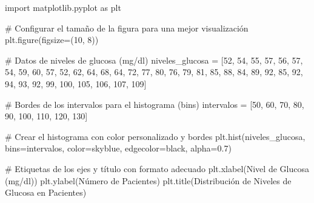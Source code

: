 \documentclass[
  jou,
  floatsintext,
  longtable,
  a4paper,
  nolmodern,
  notxfonts,
  notimes,
  colorlinks=true,linkcolor=blue,citecolor=blue,urlcolor=blue]{apa7}
\newenvironment{Shaded}{\begin{snugshade}}{\end{snugshade}}
\newcommand{\CommentTok}[1]{\textcolor[rgb]{0.37,0.37,0.37}{#1}}
\newcommand{\DecValTok}[1]{\textcolor[rgb]{0.68,0.00,0.00}{#1}}
\newcommand{\FloatTok}[1]{\textcolor[rgb]{0.68,0.00,0.00}{#1}}
\newcommand{\ImportTok}[1]{\textcolor[rgb]{0.00,0.46,0.62}{#1}}
\newcommand{\NormalTok}[1]{\textcolor[rgb]{0.00,0.23,0.31}{#1}}
\newcommand{\OperatorTok}[1]{\textcolor[rgb]{0.37,0.37,0.37}{#1}}
\newcommand{\StringTok}[1]{\textcolor[rgb]{0.13,0.47,0.30}{#1}}
\begin{document}
\begin{Shaded}
\begin{Highlighting}[]
\ImportTok{import}\NormalTok{ matplotlib.pyplot }\ImportTok{as}\NormalTok{ plt}

\CommentTok{\# Configurar el tamaño de la figura para una mejor visualización}
\NormalTok{plt.figure(figsize}\OperatorTok{=}\NormalTok{(}\DecValTok{10}\NormalTok{, }\DecValTok{8}\NormalTok{))}

\CommentTok{\# Datos de niveles de glucosa (mg/dl)}
\NormalTok{niveles\_glucosa }\OperatorTok{=}\NormalTok{ [}\DecValTok{52}\NormalTok{, }\DecValTok{54}\NormalTok{, }\DecValTok{55}\NormalTok{, }\DecValTok{57}\NormalTok{, }\DecValTok{56}\NormalTok{, }\DecValTok{57}\NormalTok{, }\DecValTok{54}\NormalTok{, }\DecValTok{59}\NormalTok{, }\DecValTok{60}\NormalTok{, }\DecValTok{57}\NormalTok{, }\DecValTok{52}\NormalTok{, }\DecValTok{62}\NormalTok{, }\DecValTok{64}\NormalTok{, }\DecValTok{68}\NormalTok{, }\DecValTok{64}\NormalTok{, }\DecValTok{72}\NormalTok{, }\DecValTok{77}\NormalTok{, }\DecValTok{80}\NormalTok{, }
                   \DecValTok{76}\NormalTok{, }\DecValTok{79}\NormalTok{, }\DecValTok{81}\NormalTok{, }\DecValTok{85}\NormalTok{, }\DecValTok{88}\NormalTok{, }\DecValTok{84}\NormalTok{, }\DecValTok{89}\NormalTok{, }\DecValTok{92}\NormalTok{, }\DecValTok{85}\NormalTok{, }\DecValTok{92}\NormalTok{, }\DecValTok{94}\NormalTok{, }\DecValTok{93}\NormalTok{, }\DecValTok{92}\NormalTok{, }\DecValTok{99}\NormalTok{, }\DecValTok{100}\NormalTok{, }\DecValTok{105}\NormalTok{, }\DecValTok{106}\NormalTok{, }\DecValTok{107}\NormalTok{, }\DecValTok{109}\NormalTok{]}

\CommentTok{\# Bordes de los intervalos para el histograma (bins)}
\NormalTok{intervalos }\OperatorTok{=}\NormalTok{ [}\DecValTok{50}\NormalTok{, }\DecValTok{60}\NormalTok{, }\DecValTok{70}\NormalTok{, }\DecValTok{80}\NormalTok{, }\DecValTok{90}\NormalTok{, }\DecValTok{100}\NormalTok{, }\DecValTok{110}\NormalTok{, }\DecValTok{120}\NormalTok{, }\DecValTok{130}\NormalTok{]}

\CommentTok{\# Crear el histograma con color personalizado y bordes}
\NormalTok{plt.hist(niveles\_glucosa, bins}\OperatorTok{=}\NormalTok{intervalos, color}\OperatorTok{=}\StringTok{\textquotesingle{}skyblue\textquotesingle{}}\NormalTok{, edgecolor}\OperatorTok{=}\StringTok{\textquotesingle{}black\textquotesingle{}}\NormalTok{, alpha}\OperatorTok{=}\FloatTok{0.7}\NormalTok{)}

\CommentTok{\# Etiquetas de los ejes y título con formato adecuado}
\NormalTok{plt.xlabel(}\StringTok{\textquotesingle{}Nivel de Glucosa (mg/dl)\textquotesingle{}}\NormalTok{)}
\NormalTok{plt.ylabel(}\StringTok{\textquotesingle{}Número de Pacientes\textquotesingle{}}\NormalTok{)}
\NormalTok{plt.title(}\StringTok{\textquotesingle{}Distribución de Niveles de Glucosa en Pacientes\textquotesingle{}}\NormalTok{)}


\end{Highlighting}
\end{Shaded}
\end{document}
